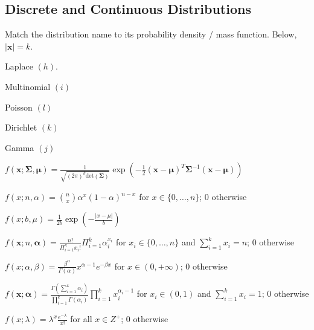 \documentclass[a4paper]{article}
\theoremstyle{definition}
\newcommand{\vc}[1]{\boldsymbol{#1}}
\newcommand{\xv}{\vc{x}}
\newcommand{\Sigmav}{\vc{\Sigma}}
\newcommand{\alphav}{\vc{\alpha}}
\newcommand{\muv}{\vc{\mu}}
\newenvironment{soln}{
    \leavevmode\color{blue}\ignorespaces
}{}
\begin{document}
\subsection{Discrete and Continuous Distributions}
Match the distribution name to its probability density / mass
function. Below, $|\xv| = k$.
\begin{enumerate}[(a)]
\begin{minipage}{0.3\linewidth}
    \item Laplace \begin{soln}  $(h)$. \end{soln}
    \item Multinomial \begin{soln} $(i)$  \end{soln}
    \item Poisson \begin{soln}  $(l)$ \end{soln}
    \item Dirichlet \begin{soln}  $(k)$ \end{soln}
    \item Gamma \begin{soln}  $(j)$ \end{soln}
\end{minipage}
\begin{minipage}{0.5\linewidth}
    \item $f(\xv; \Sigmav, \muv) = \frac{1}{\sqrt{(2\pi)^k \mathrm{det}(\Sigmav) }} \exp\left( -\frac{1}{2}
        (\xv - \muv)^T \Sigmav^{-1} (\xv - \muv)  \right)$
    \item $f(x; n, \alpha) = \binom{n}{x} \alpha^x (1 - \alpha)^{n-x}$
      for $x \in \{0,\ldots, n\}$; $0$ otherwise
    \item $f(x; b, \mu) = \frac{1}{2b} \exp\left( - \frac{|x - \mu|}{b} \right)$
    \item $f(\xv; n, \alphav) = \frac{n!}{\Pi_{i=1}^k x_i!}
      \Pi_{i=1}^k \alpha_i^{x_i}$ for $x_i \in \{0,\ldots,n\}$ and
      $\sum_{i=1}^k x_i = n$; $0$ otherwise
    \item $f(x; \alpha, \beta) = \frac{\beta^{\alpha}}{\Gamma(\alpha)} x^{\alpha -
        1}e^{-\beta x}$ for $x \in (0,+\infty)$; $0$ otherwise
    \item $f(\xv; \alphav) = \frac{\Gamma(\sum_{i=1}^k
        \alpha_i)}{\prod_{i=1}^k \Gamma(\alpha_i)} \prod_{i=1}^{k}
      x_i^{\alpha_i - 1}$ for $x_i \in (0,1)$ and $\sum_{i=1}^k x_i =
      1$; 0 otherwise
    \item $f(x; \lambda) = \lambda^x \frac{e^{-\lambda}}{x!}$ for all
      $x \in Z^+$; $0$ otherwise
\end{minipage}
\end{enumerate}
        
\end{document}
